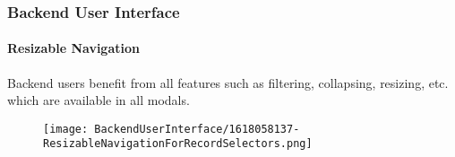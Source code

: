 %

\begin{frame}[fragile]
	\frametitle{Backend User Interface}
	\framesubtitle{Resizable Navigation}

	Backend users benefit from all features such as filtering, collapsing, resizing,
	etc. which are available in all modals.

	\begin{figure}
		\texttt{[image: BackendUserInterface/1618058137-ResizableNavigationForRecordSelectors.png]}
	\end{figure}

\end{frame}

